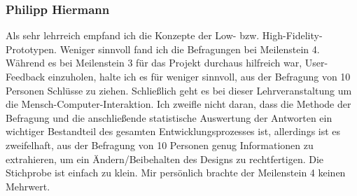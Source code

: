 \documentclass[a4paper,10pt]{scrartcl}
\begin{document}
\subsubsection{Philipp Hiermann}
Als sehr lehrreich empfand ich die Konzepte der Low- bzw. High-Fidelity-Prototypen. 
Weniger sinnvoll fand ich die Befragungen bei Meilenstein 4. Während es bei Meilenstein 3 für das Projekt durchaus hilfreich war, User-Feedback einzuholen, halte ich es für weniger sinnvoll, aus der Befragung von 10 Personen Schlüsse zu ziehen. Schließlich geht es bei dieser Lehrveranstaltung um die Mensch-Computer-Interaktion. Ich zweifle nicht daran, dass die Methode der Befragung und die anschließende statistische Auswertung der Antworten ein wichtiger Bestandteil des gesamten Entwicklungsprozesses ist, allerdings ist es zweifelhaft, aus der Befragung von 10 Personen genug Informationen zu extrahieren, um ein Ändern/Beibehalten des Designs zu rechtfertigen. Die Stichprobe ist einfach zu klein. Mir persönlich brachte der Meilenstein 4 \also keinen Mehrwert.   
\end{document}
